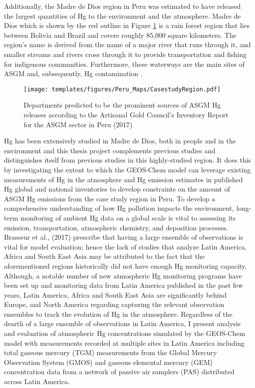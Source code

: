 \begin{flushleft}
Additionally, the Madre de Dios region in Peru was estimated to have released the largest quantities of Hg to the environment and the atmosphere\cite{agc_reporte_2017}. Madre de Dios which is shown by the red outline in Figure \ref{fig:PeruCS} is a rain forest region that lies between Bolivia and Brazil and covers roughly 85,000 square kilometers. The region's name is derived from the name of a major river that runs through it, and smaller streams and rivers cross through it to provide transportation and fishing for indigenous communities. Furthermore, these waterways are the main sites of ASGM and, subsequently, Hg contamination \cite{ashe_elevated_2012,agc_reporte_2017}. 
\begin{figure}[H]
  \texttt{[image: templates/figures/Peru\_Maps/CasestudyRegion.pdf]}
  \centering
  \caption{Departments predicted to be the prominent sources of ASGM Hg releases according to the Artisanal Gold Council's  Inventory Report for the ASGM sector in Peru (2017) }
  \label{fig:PeruCS}
\end{figure}
\FloatBarrier

Hg has been extensively studied in Madre de Dios, both in people and in the environment and this thesis project complements previous studies and distinguishes itself from previous studies in this highly-studied region. It does this by investigating the extent to which the GEOS-Chem model can leverage existing measurements of Hg in the atmosphere and Hg emission estimates in published Hg global and national inventories to develop constraints on the amount of ASGM Hg emissions from the case study region in Peru. To develop a comprehensive understanding of how Hg pollution impacts the environment, long-term monitoring of ambient Hg data on a global scale is vital to assessing its emission, transportation, atmospheric chemistry, and deposition processes. Brasseur et al., (2017) prescribe that having a large ensemble of observations is vital for model evaluation; hence the lack of studies that analyze Latin America, Africa and South East Asia may be attributed to the fact that the aforementioned regions historically did not have enough Hg monitoring capacity. Although, a notable number of new atmospheric Hg monitoring programs have been set up and monitoring data from Latin America published in the past few years, Latin America, Africa and South East Asia are significantly behind Europe, and North America regarding capturing the relevant observation ensembles to track the evolution of Hg in the atmosphere. Regardless of the dearth of a large ensemble  of observations in Latin America, I present analysis and evaluation of atmospheric Hg concentrations simulated by the GEOS-Chem model with measurements recorded at multiple sites in Latin America including total gaseous mercury (TGM) measurements from the Global Mercury Observation System (GMOS) and gaseous elemental mercury (GEM) concentration data from a network of passive air samplers (PAS) distributed across Latin America. 

\end{flushleft}


